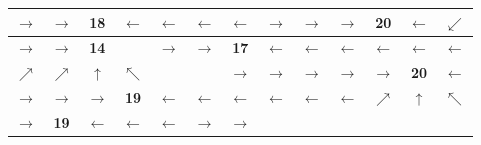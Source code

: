 \begin{center}
\begin{minipage}{\textwidth}
\renewcommand{\arraystretch}{1.4}
\begin{table}[H]
\centering 
\begin{scriptsize}
\begin{tabular}{|>{}c|>{}c|>{}c|>{}c|>{}c|>{}c|>{}c|>{}c|>{}c|>{}c|>{}c|>{}c|>{}c|}
\hline
\cellcolor{red!15!white}$\rightarrow$&\cellcolor{red!15!white}$\rightarrow$&\cellcolor{red!15!white}\bf{18}&\cellcolor{red!15!white}$\leftarrow$&\cellcolor{red!15!white}$\leftarrow$&\cellcolor{red!15!white}$\leftarrow$&\cellcolor{red!15!white}$\leftarrow$&
\cellcolor{green!15!white}$\rightarrow$&\cellcolor{green!15!white}$\rightarrow$&\cellcolor{green!15!white}$\rightarrow$&\cellcolor{green!15!white}\bf{20}&\cellcolor{green!15!white}$\leftarrow$&\cellcolor{yellow!15!white}$\swarrow$\\
\hline
\cellcolor{green!15!white}$\rightarrow$&\cellcolor{green!15!white}$\rightarrow$&\cellcolor{green!15!white}\bf{14}&\cellcolor{gray!50!white} &\cellcolor{yellow!15!white}$\rightarrow$&\cellcolor{yellow!15!white}$\rightarrow$& \cellcolor{yellow!15!white}\bf{17}&\cellcolor{yellow!15!white}$\leftarrow$&\cellcolor{yellow!15!white}$\leftarrow$&\cellcolor{yellow!15!white}$\leftarrow$&\cellcolor{yellow!15!white}$\leftarrow$&\cellcolor{yellow!15!white}$\leftarrow$&\cellcolor{yellow!15!white}$\leftarrow$ \\
\hline
\cellcolor{green!15!white}$\nearrow$&\cellcolor{green!15!white}$\nearrow$&\cellcolor{green!15!white}$\uparrow$&\cellcolor{green!15!white}$\nwarrow$&\cellcolor{gray!50!white} &\cellcolor{gray!50!white} &\cellcolor{blue!15!white}$\rightarrow$&\cellcolor{blue!15!white}$\rightarrow$&\cellcolor{blue!15!white}$\rightarrow$&\cellcolor{blue!15!white}$\rightarrow$&\cellcolor{blue!15!white}$\rightarrow$&\cellcolor{blue!15!white}\bf{20}&\cellcolor{blue!15!white}$\leftarrow$ \\
\hline
\cellcolor{red!15!white}$\rightarrow$&\cellcolor{red!15!white}$\rightarrow$&\cellcolor{red!15!white}$\rightarrow$&\cellcolor{red!15!white}\bf{19}&\cellcolor{red!15!white}$\leftarrow$&\cellcolor{red!15!white}$\leftarrow$&\cellcolor{red!15!white}$\leftarrow$&\cellcolor{red!15!white}$\leftarrow$
&\cellcolor{red!15!white}$\leftarrow$&\cellcolor{red!15!white}$\leftarrow$&\cellcolor{blue!15!white}$\nearrow$&\cellcolor{blue!15!white}$\uparrow$&\cellcolor{blue!15!white}$\nwarrow$ \\
\hline
\cellcolor{yellow!15!white}$\rightarrow$&\cellcolor{yellow!15!white}\bf{19}&\cellcolor{yellow!15!white}$\leftarrow$&\cellcolor{yellow!15!white}$\leftarrow$&\cellcolor{yellow!15!white}$\leftarrow$&\cellcolor{green!15!white}$\rightarrow$&\cellcolor{green!15!white}$\rightarrow$

\end{tabular}
\end{scriptsize}
\end{table}
\end{minipage}
\end{center}
